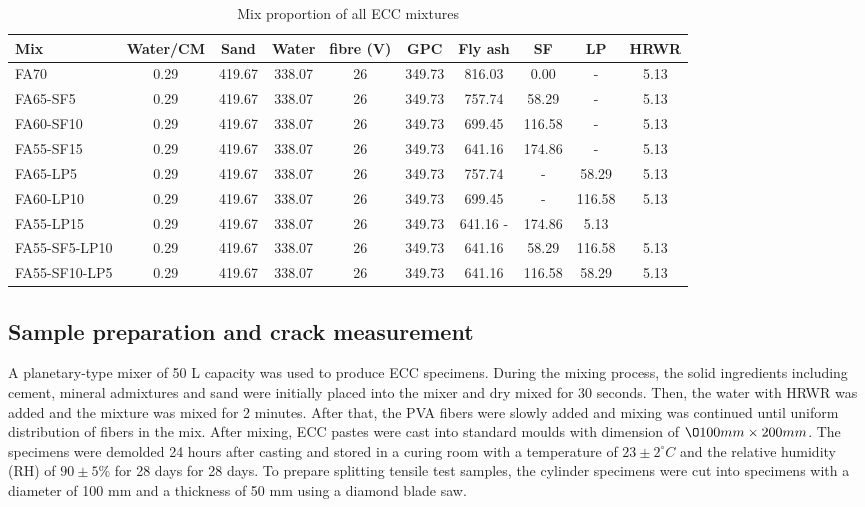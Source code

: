 \documentclass[11pt]{article}
\begin{document}
	
	\begin{table}[!tp]
		\centering
		\caption{Mix proportion of all ECC mixtures}
		\begin{tabular}{lccccccccc}
			\toprule
			Mix&	Water/CM	&Sand&	Water&	fibre (V)&	GPC	&Fly ash&	SF&	LP&	HRWR
			\\
			\midrule
			FA70&	0.29&	419.67&	338.07	&26	&349.73&	816.03	&0.00&	-	&5.13
			\\
			FA65-SF5&	0.29&	419.67&	338.07&	26	&349.73	&757.74&	58.29&	-&	5.13
			\\
			FA60-SF10	&0.29&	419.67&	338.07&26&	349.73&	699.45&	116.58	&-&	5.13
			\\
			FA55-SF15&	0.29&	419.67&	338.07&	26&	349.73&	641.16&	174.86	&-&	5.13
			\\
			FA65-LP5&	0.29&	419.67	&338.07&	26	&349.73	&757.74	&-	&58.29&	5.13
			\\
			FA60-LP10&	0.29&	419.67&	338.07&	26&	349.73	&699.45	&-	&116.58	&5.13
			\\
			FA55-LP15&	0.29&	419.67&	338.07&	26&	349.73	&641.16	-&	174.86	&5.13
			\\
			FA55-SF5-LP10&	0.29&	419.67&	338.07	&26&	349.73&	641.16	&58.29	&116.58	&5.13
			\\
			FA55-SF10-LP5	&0.29	&419.67	&338.07	&26	&349.73	&641.16	&116.58	&58.29	&5.13
			\\
			\bottomrule
		\end{tabular}
		\label{mx}
	\end{table}
	

\subsection{Sample preparation and crack measurement}
	\label{experi}
	A planetary-type mixer of 50 L capacity was used to produce ECC specimens. During the mixing process, the solid ingredients including cement, mineral admixtures and sand were initially placed into the mixer and dry mixed for 30 seconds. Then, the water with HRWR was added and the mixture was mixed for 2 minutes. After that, the PVA fibers were slowly added and mixing was continued until uniform distribution of fibers in the mix. After mixing, ECC pastes were cast into standard moulds with dimension of $\O 100mm \times 200mm$. The specimens were demolded 24 hours after casting and stored in a curing room with a temperature of $23 \pm 2^\circ C$ and the relative humidity (RH) of $90 \pm 5\%$ for 28 days for 28 days. To prepare splitting tensile test samples, the cylinder specimens were cut into specimens with a diameter of 100 mm and a thickness of 50 mm using a diamond blade saw.
\end{document}
